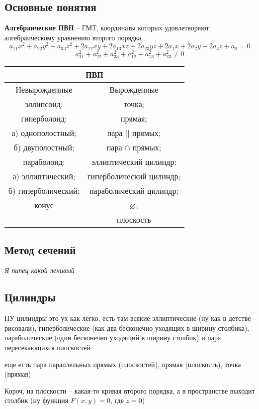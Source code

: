 \documentclass{article}
\begin{document}
\subsection{Основные понятия}
\textbf{Алгебраические ПВП} -- ГМТ, координаты которых удовлетворяют алгебраическому уравнению второго порядка.
$$ a_{11}x^2+a_{22}y^2+a_{33}z^2+2a_{12}xy+2a_{13}xz+2a_{23}yz+2a_1x+2a_2y+2a_3z+a_0=0 $$
$$a_{11}^2+a_{22}^2+a_{33}^2+a_{12}^2+a_{13}^2+a_{23}^2\neq0$$
\begin{center}
    \begin{tabular}{|c|c|}
        \hline
        \multicolumn{2}{|c|}{ПВП} \\
        \hline
         Невырожденные & Вырожденные \\
         \hline
         эллипсоид; & точка; \\
         гиперболоид: & прямая; \\
         а) однополостный; & пара $||$ прямых; \\
         б) двуполостный; & пара $\cap$ прямых; \\
         параболоид: & эллиптический цилиндр; \\
         а) эллиптический; & гиперболический цилиндр; \\
         б) гиперболический; & параболический цилиндр; \\
         конус & $\varnothing$; \\
         & плоскость \\
          \hline
    \end{tabular}
\end{center}
\subsection{Метод сечений}

\textit{Я пипец какой ленивый}
\newpage

\subsection{Цилиндры}
НУ цилиндры это ух как легко, есть там всякие эллиптические (ну как в детстве рисовали), гиперболические (как два бесконечно уходящих в ширину столбика), параболические (один бесконечно уходящий в ширину столбик) и пара пересекающихся плоскостей

еще есть пара параллельных прямых (плоскостей), прямая (плоскость), точка (прямая)

Короч, на плоскости -- какая-то кривая второго порядка, а в пространстве выходит столбик (ну функция $F(x,y)=0$, где $z=0$)
\end{document}
